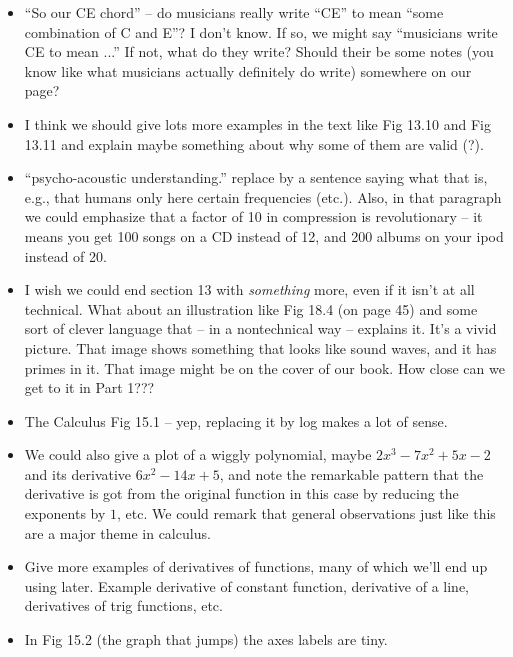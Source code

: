 \documentclass{article}
\begin{document}
\begin{itemize}
\item ``So our CE chord'' -- do musicians really write ``CE'' to mean
  ``some combination of C and E''?  I don't know.  If so, we might say
  ``musicians write CE to mean ...''  If not, what do they write?
  Should their be some notes (you know like what musicians actually
  definitely do write) somewhere on our page?

\item I think we should give lots more examples in the text like Fig
  13.10 and Fig 13.11 and explain maybe something about why some of
  them are valid (?).   

\item ``psycho-acoustic understanding.'' replace by a sentence saying
  what that is, e.g., that humans only here certain frequencies
  (etc.).  Also, in that paragraph we could emphasize that a factor of
  10 in compression is revolutionary -- it means you get 100 songs on
  a CD instead of 12, and 200 albums on your ipod instead of 20.

\item I wish we could end section 13 with {\em something} more, even
  if it isn't at all technical. What about an illustration like Fig
  18.4 (on page 45) and some sort of clever language that -- in a
  nontechnical way -- explains it.  It's a vivid picture.  That image
  shows something that looks like sound waves, and it has primes in
  it.  That image might be on the cover of our book.  How close can we
  get to it in Part 1???

\item The Calculus Fig 15.1 -- yep, replacing it by log makes a lot of sense.

\item We could also give a plot of a wiggly polynomial, maybe $2x^3 -
  7x^2 + 5x - 2$ and its derivative $6x^2 - 14x + 5$, and note the
  remarkable pattern that the derivative is got from the original
  function in this case by reducing the exponents by $1$, etc.  We
  could remark that general observations just like this are a major
  theme in calculus.  

\item Give more examples of derivatives of functions, many of which
  we'll end up using later.  Example derivative of constant function,
  derivative of a line, derivatives of trig functions, etc. 

\item In Fig 15.2 (the graph that jumps) the axes labels are tiny.


\end{itemize}
\end{document}
